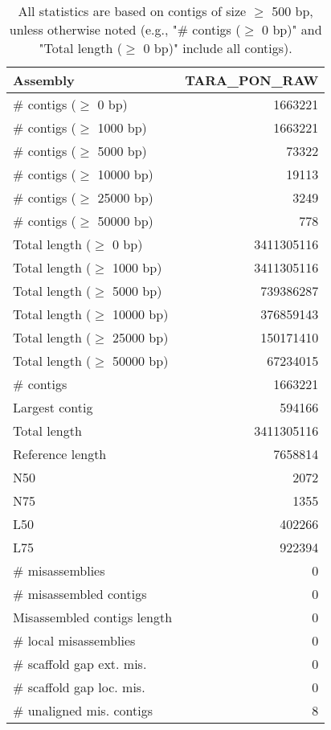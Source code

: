 \documentclass[12pt,a4paper]{article}
\begin{document}
\begin{table}[ht]
\begin{center}
\caption{All statistics are based on contigs of size $\geq$ 500 bp, unless otherwise noted (e.g., "\# contigs ($\geq$ 0 bp)" and "Total length ($\geq$ 0 bp)" include all contigs).}
\begin{tabular}{|l*{1}{|r}|}
\hline
Assembly & TARA\_PON\_RAW \\ \hline
\# contigs ($\geq$ 0 bp) & 1663221 \\ \hline
\# contigs ($\geq$ 1000 bp) & 1663221 \\ \hline
\# contigs ($\geq$ 5000 bp) & 73322 \\ \hline
\# contigs ($\geq$ 10000 bp) & 19113 \\ \hline
\# contigs ($\geq$ 25000 bp) & 3249 \\ \hline
\# contigs ($\geq$ 50000 bp) & 778 \\ \hline
Total length ($\geq$ 0 bp) & 3411305116 \\ \hline
Total length ($\geq$ 1000 bp) & 3411305116 \\ \hline
Total length ($\geq$ 5000 bp) & 739386287 \\ \hline
Total length ($\geq$ 10000 bp) & 376859143 \\ \hline
Total length ($\geq$ 25000 bp) & 150171410 \\ \hline
Total length ($\geq$ 50000 bp) & 67234015 \\ \hline
\# contigs & 1663221 \\ \hline
Largest contig & 594166 \\ \hline
Total length & 3411305116 \\ \hline
Reference length & 7658814 \\ \hline
N50 & 2072 \\ \hline
N75 & 1355 \\ \hline
L50 & 402266 \\ \hline
L75 & 922394 \\ \hline
\# misassemblies & 0 \\ \hline
\# misassembled contigs & 0 \\ \hline
Misassembled contigs length & 0 \\ \hline
\# local misassemblies & 0 \\ \hline
\# scaffold gap ext. mis. & 0 \\ \hline
\# scaffold gap loc. mis. & 0 \\ \hline
\# unaligned mis. contigs & 8 \\ \hline

\end{tabular}
\end{center}
\end{table}
\end{document}

